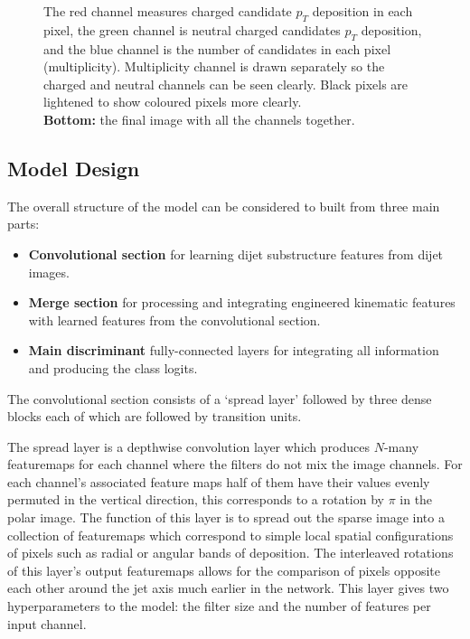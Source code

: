 \begin{figure}[h!]
{             The red channel measures charged candidate $p_T$ deposition in each pixel, 
             the green channel is neutral charged candidates $p_T$ deposition, 
             and the blue channel is the number of candidates in each pixel (multiplicity). 
             Multiplicity channel is drawn separately so the charged and neutral channels can be seen clearly. Black pixels are lightened to show coloured pixels more clearly.\\
             \textbf{Bottom:} 
             the final image with all the channels together.}
    \label{fig:event_categorisation:jet_image}
\end{figure}



\subsection{Model Design}

The overall structure of the model can be considered to built from three main parts:
\begin{itemize}[leftmargin=.5in,noitemsep]
    \item \textbf{Convolutional section} for learning dijet substructure features from dijet images.
    \item \textbf{Merge section} for processing and integrating engineered kinematic features with learned features from the convolutional section.
    \item \textbf{Main discriminant} fully-connected layers for integrating all information and producing the class logits.
\end{itemize}


The convolutional section consists of a `spread layer' followed by three dense blocks each of which are followed by transition units.

The spread layer is a depthwise convolution layer which produces $N$-many featuremaps for each channel where the filters do not mix the image channels. 
For each channel's associated feature maps half of them have their values evenly permuted in the vertical direction, this corresponds to a rotation by $\pi$ in the polar image.
The function of this layer is to spread out the sparse image into a collection of featuremaps which correspond to simple local spatial configurations of pixels such as radial or angular bands of deposition. 
The interleaved rotations of this layer's output featuremaps allows for the comparison of pixels opposite each other around the jet axis much earlier in the network.  
This layer gives two hyperparameters to the model: the filter size and the number of features per input channel.


